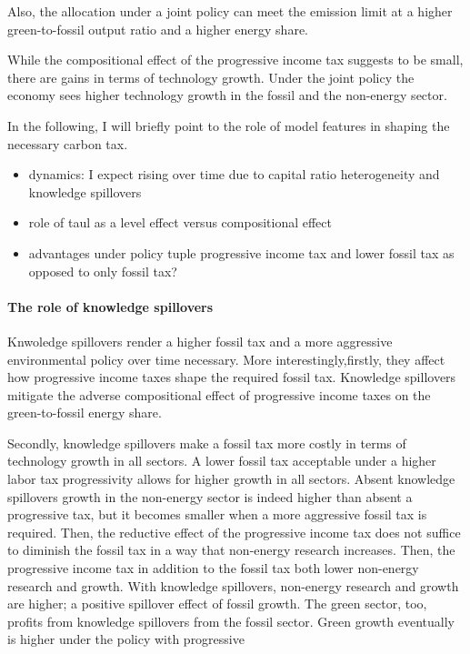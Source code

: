 Also, the allocation under a joint policy can meet the emission limit at a higher green-to-fossil output ratio and a higher energy share. 
 
While the compositional effect of the progressive income tax suggests to be small, there are gains in terms of technology growth. 
Under the joint policy the economy sees higher technology growth in the fossil and the non-energy sector. 

 
 In the following, I will briefly point to the role of model features in shaping the necessary carbon tax. 
 \begin{itemize}
 	\item dynamics: I expect rising over time due to capital ratio heterogeneity and knowledge spillovers
 	\item role of taul as a level effect versus compositional effect
 	\item advantages under policy tuple progressive income tax and lower fossil tax as opposed to only fossil tax?
 \end{itemize}

\paragraph{The role of knowledge spillovers}
Knwoledge spillovers render a higher fossil tax and a more aggressive environmental policy over time necessary. 
More interestingly,firstly, they affect how progressive income taxes shape the required fossil tax. Knowledge spillovers mitigate the adverse compositional effect of progressive income taxes on the green-to-fossil energy share. %

Secondly, knowledge spillovers make a fossil tax more costly in terms of technology growth in all sectors.  A lower fossil tax acceptable under a higher labor tax progressivity allows for higher growth in all sectors. 
Absent knowledge spillovers growth in the non-energy sector is indeed higher than absent a progressive tax, but it becomes smaller when a more aggressive fossil tax is required. Then, the reductive effect of the progressive income tax does not suffice to diminish the fossil tax in a way that non-energy research increases. Then, the progressive income tax in addition to the fossil tax both lower non-energy research and growth. With knowledge spillovers, non-energy research and growth are higher; a positive spillover effect of fossil growth. The green sector, too, profits from knowledge spillovers from the fossil sector. Green growth eventually is higher under the policy with progressive 

